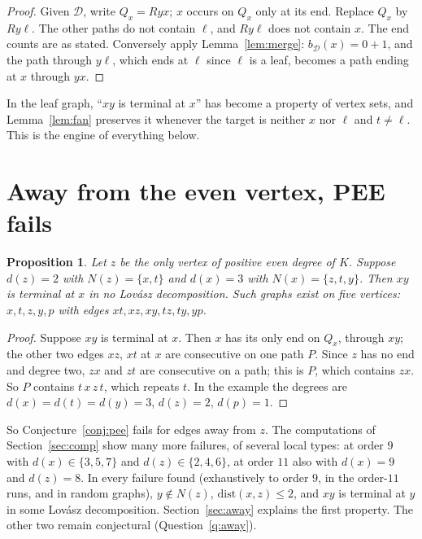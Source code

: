 \documentclass[11pt]{amsart}
\newtheorem{proposition}[theorem]{Proposition}
\theoremstyle{definition}
\newcommand{\cD}{\mathcal D}
\begin{document}
\begin{proof}
Given $\cD$, write $Q_x=Ryx$; $x$ occurs on $Q_x$ only at its end. Replace $Q_x$ by $Ry\ell$. The
other paths do not contain $\ell$, and $Ry\ell$ does not contain $x$. The end counts are as stated.
Conversely apply Lemma~\ref{lem:merge}: $b_\cD(x)=0+1$, and the path through $y\ell$, which ends at
$\ell$ since $\ell$ is a leaf, becomes a path ending at $x$ through $yx$.
\end{proof}

In the leaf graph, ``$xy$ is terminal at $x$'' has become a property of vertex sets, and
Lemma~\ref{lem:fan} preserves it whenever the target is neither $x$ nor $\ell$ and $t\ne\ell$. This is the engine of
everything below.

\section{Away from the even vertex, PEE fails}\label{sec:counter}

\begin{proposition}\label{prop:counter}
Let $z$ be the only vertex of positive even degree of $K$. Suppose $d(z)=2$ with $N(z)=\{x,t\}$ and
$d(x)=3$ with $N(x)=\{z,t,y\}$. Then $xy$ is terminal at $x$ in no Lov\'asz decomposition. Such graphs
exist on five vertices: $x,t,z,y,p$ with edges $xt,xz,xy,tz,ty,yp$.
\end{proposition}

\begin{proof}
Suppose $xy$ is terminal at $x$. Then $x$ has its only end on $Q_x$, through $xy$; the other two edges
$xz$, $xt$ at $x$ are consecutive on one path $P$. Since $z$ has no end and degree two, $zx$ and $zt$
are consecutive on a path; this is $P$, which contains $zx$. So $P$ contains $t\,x\,z\,t$, which repeats
$t$. In the example the degrees are $d(x)=d(t)=d(y)=3$, $d(z)=2$, $d(p)=1$.
\end{proof}

So Conjecture~\ref{conj:pee} fails for edges away from $z$. The computations of
Section~\ref{sec:comp} show many more failures, of several local types: at order $9$ with
$d(x)\in\{3,5,7\}$ and $d(z)\in\{2,4,6\}$, at order $11$ also with $d(x)=9$ and $d(z)=8$. In every
failure found (exhaustively to order $9$, in the order-$11$ runs, and in random graphs), $y\notin
N(z)$, $\mathrm{dist}(x,z)\le2$, and $xy$ is terminal at $y$ in some Lov\'asz decomposition. Section~\ref{sec:away} explains the first property.
The other two remain conjectural (Question~\ref{q:away}).
\end{document}

